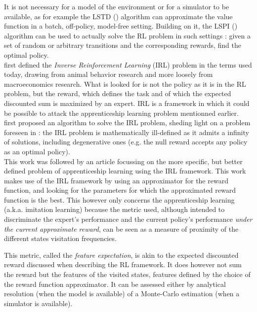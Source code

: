 \documentclass{article}
\begin{document}
It is not necessary for a model of the environment or for a simulator to be available, as for example the LSTD (\citep{bradtke1996linear}) algorithm can approximate the value function in a batch, off-policy, model-free setting. Building on it, the LSPI (\citep{lagoudakis2003least}) algorithm can be used to actually solve the RL problem in such settings : given a set of random or arbitrary transitions and the corresponding rewards, find the optimal policy.\\

\citet{russell1998learning} first defined the \emph{Inverse Reinforcement Learning} (IRL) problem in the terms used today, drawing from animal behavior research and more loosely from macroeconomics research. What is looked for is not the policy as it is in the RL problem, but the reward, which defines the task and of which the expected discounted sum is maximized by an expert. IRL is a framework in which it could be possible to attack the apprenticeship learning problem mentionned earlier.\\

\citet{ng2000algorithms} first proposed an algorithm to solve the IRL problem, sheding light on a problem foreseen in \citep{russell1998learning} : the IRL problem is mathematically ill-defined as it admits a infinity of solutions, including degenerative ones (e.g. the null reward accepts any policy as an optimal policy).\\

This work was followed by an article \citep{abbeel2004apprenticeship} focussing on the more specific, but better defined problem of apprenticeship learning using the IRL framework. This work makes use of the IRL framework by using an approximator for the reward function, and looking for the parameters for which the approximated reward function is the best. This however only concerns the apprenticeship learning (a.k.a. imitation learning) because the metric used, although intended to discriminate the expert's performance and the current policy's performance \emph{under the current approximate reward}, can be seen as a measure of proximity of the different states visitation frequencies.

This metric, called the \emph{feature expectation}, is akin to the expected discounted reward discussed when describing the RL framework. It does however not sum the reward but the features of the visited states, features defined by the choice of the reward function approximator. It can be assessed either by analytical resolution (when the model is available) of a Monte-Carlo estimation (when a simulator is available).\\
 
\end{document}
